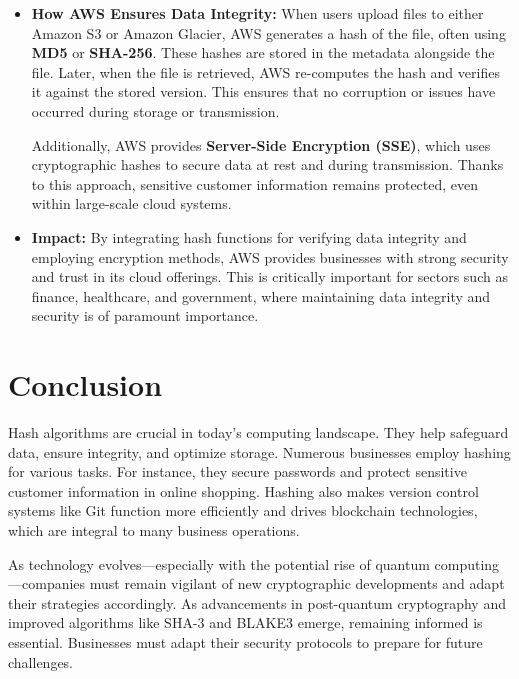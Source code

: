 \documentclass[11pt,a4paper]{article}
\begin{document}
        \begin{itemize}
            \item \textbf{How AWS Ensures Data Integrity:}
            \newline
            When users upload files to either Amazon S3 or Amazon Glacier, AWS generates a hash of the file, often using \textbf{MD5} or \textbf{SHA-256}. These hashes are stored in the metadata alongside the file. Later, when the file is retrieved, AWS re-computes the hash and verifies it against the stored version. This ensures that no corruption or issues have occurred during storage or transmission.
            \par
            Additionally, AWS provides \textbf{Server-Side Encryption (SSE)}, which uses cryptographic hashes to secure data at rest and during transmission. Thanks to this approach, sensitive customer information remains protected, even within large-scale cloud systems.

            \item \textbf{Impact:}
            \newline
            By integrating hash functions for verifying data integrity and employing encryption methods, AWS provides businesses with strong security and trust in its cloud offerings. This is critically important for sectors such as finance, healthcare, and government, where maintaining data integrity and security is of paramount importance.

        \end{itemize}

\newpage

\section*{Conclusion}

Hash algorithms are crucial in today's computing landscape. They help safeguard data, ensure integrity, and optimize storage. Numerous businesses employ hashing for various tasks. For instance, they secure passwords and protect sensitive customer information in online shopping. Hashing also makes version control systems like Git function more efficiently and drives blockchain technologies, which are integral to many business operations.

As technology evolves—especially with the potential rise of quantum computing—companies must remain vigilant of new cryptographic developments and adapt their strategies accordingly. As advancements in post-quantum cryptography and improved algorithms like SHA-3 and BLAKE3 emerge, remaining informed is essential. Businesses must adapt their security protocols to prepare for future challenges.
\end{document}
